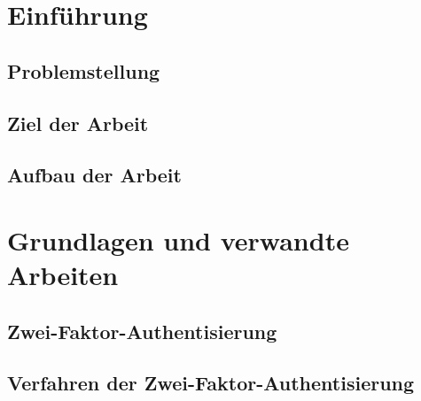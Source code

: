 \documentclass[doktyp=marbeit, twoside]{TUBAFarbeiten}
\begin{document}
\maketitle

\TUBAFErklaerungsseite



\begin{abstract}
    
\end{abstract}
\newpage

\tableofcontents
\newpage

\newpage
\listoffigures
\newpage
\listoftables

\newpage
\section{Einführung}
	\label{sec: einfuhrung}

	\subsection{Problemstellung}
		\label{sec: problemstellung}
        

    \subsection{Ziel der Arbeit}
        \label{sec: ziel der arbeit}
        

    \subsection{Aufbau der Arbeit}
        \label{sec: aufbau der arbeit}
        

\newpage
\section{Grundlagen und verwandte Arbeiten}
    \label{sec: grundlagen}
    

    \subsection{Zwei-Faktor-Authentisierung}
        \label{sec: 2fa}
        
    
    \subsection{Verfahren der Zwei-Faktor-Authentisierung}
        \label{sec: verfahren der 2fa}
        
\end{document}
